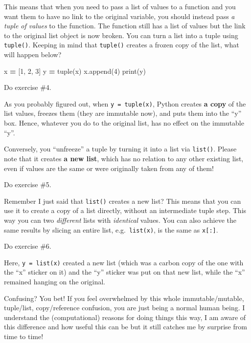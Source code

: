 \documentclass[
]{book}
\newenvironment{Shaded}{\begin{snugshade}}{\end{snugshade}}
\newcommand{\BuiltInTok}[1]{#1}
\newcommand{\DecValTok}[1]{\textcolor[rgb]{0.00,0.00,0.81}{#1}}
\newcommand{\NormalTok}[1]{#1}
\newcommand{\OperatorTok}[1]{\textcolor[rgb]{0.81,0.36,0.00}{\textbf{#1}}}
\begin{document}
This means that when you need to pass a list of values to a function and you want them to have no link to the original variable, you should instead pass \emph{a tuple of values} to the function. The function still has a list of values but the link to the original list object is now broken. You can turn a list into a tuple using \texttt{tuple()}. Keeping in mind that \texttt{tuple()} creates a frozen copy of the list, what will happen below?

\begin{Shaded}
\begin{Highlighting}[]
\NormalTok{x }\OperatorTok{=}\NormalTok{ [}\DecValTok{1}\NormalTok{, }\DecValTok{2}\NormalTok{, }\DecValTok{3}\NormalTok{]}
\NormalTok{y }\OperatorTok{=} \BuiltInTok{tuple}\NormalTok{(x)}
\NormalTok{x.append(}\DecValTok{4}\NormalTok{)}
\BuiltInTok{print}\NormalTok{(y)}
\end{Highlighting}
\end{Shaded}

Do exercise \#4.

As you probably figured out, when \texttt{y\ =\ tuple(x)}, Python creates \textbf{a copy} of the list values, freezes them (they are immutable now), and puts them into the ``y'' box. Hence, whatever you do to the original list, has no effect on the immutable ``y''.

Conversely, you ``unfreeze'' a tuple by turning it into a list via \texttt{list()}. Please note that it creates \textbf{a new list}, which has no relation to any other existing list, even if values are the same or were originally taken from any of them!

Do exercise \#5.

Remember I just said that \texttt{list()} creates a new list? This means that you can use it to create a copy of a list directly, without an intermediate tuple step. This way you can two \emph{different} lists with \emph{identical} values. You can also achieve the same results by slicing an entire list, e.g.~\texttt{list(x)}, is the same as \texttt{x{[}:{]}}.

Do exercise \#6.

Here, \texttt{y\ =\ list(x)} created a new list (which was a carbon copy of the one with the ``x'' sticker on it) and the ``y'' sticker was put on that new list, while the ``x'' remained hanging on the original.

Confusing? You bet! If you feel overwhelmed by this whole immutable/mutable, tuple/list, copy/reference confusion, you are just being a normal human being. I understand the (computational) reasons for doing things this way, I am aware of this difference and how useful this can be but it still catches me by surprise from time to time!
\end{document}
